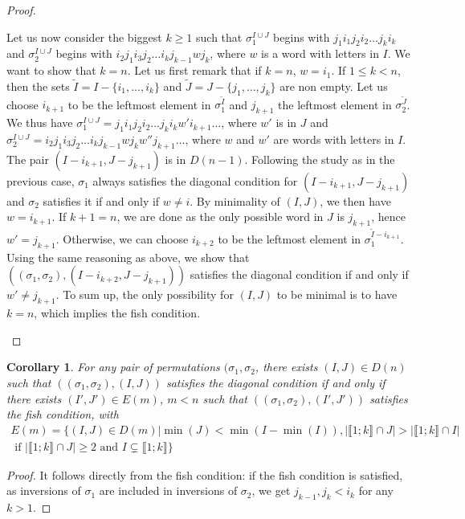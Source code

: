 \documentclass[11pt]{amsart}
\newtheorem{corollary}[thm]{Corollary}
\theoremstyle{definition}
\theoremstyle{remark}
\numberwithin{equation}{section}
\newcommand{\0}{\color{blue}{\mathsf{0}}}
\begin{document}
\begin{proof}
\begin{itemize}
Let us now consider the biggest $k\geq 1$ such that $\sigma^{I \cup J}_1$ begins with $j_1 i_1 j_2 i_2 \ldots j_k i_k$ and $\sigma^{I \cup J}_2$ begins with $i_2 j_1 i_3 j_2\ldots i_k j_{k-1} w j_k$, where $w$ is a word with letters in $I$. We want to show that $k=n$. Let us first remark that if $k=n$, $w=i_1$. If $1\leq k<n$, then the sets $\tilde{I}=I-\{i_1, \ldots, i_k\}$ and $\tilde{J}=J-\{j_1, \ldots, j_k\}$ are non empty. Let us choose $i_{k+1}$ to be the leftmost element in $\sigma^{\tilde{I}}_1$ and $j_{k+1}$ the leftmost element in $\sigma^{\tilde{J}}_2$. We thus have $\sigma^{I \cup J}_1=j_1 i_1 j_2 i_2 \ldots j_k i_k w' i_{k+1}\ldots$, where $w'$ is in $J$ and $\sigma^{I \cup J}_2= i_2 j_1 i_3 j_2\ldots i_k j_{k-1} w j_k w'' j_{k+1}\ldots $, where $w$ and $w'$ are words with letters in $I$. The pair $(I-i_{k+1},J-j_{k+1})$ is in $D(n-1)$. Following the study as in the previous case, $\sigma_1$ always satisfies the diagonal condition for $(I-i_{k+1},J-j_{k+1})$ and $\sigma_2$ satisfies it if and only if $w \neq i$. By minimality of $(I,J)$, we then have $w=i_{k+1}$. If $k+1=n$, we are done as the only possible word in $J$ is $j_{k+1}$, hence $w'=j_{k+1}$. Otherwise, we can choose $i_{k+2}$ to be the leftmost element in $\sigma_1^{\tilde{I}-i_{k+1}}$. Using the same reasoning as above, we show that $((\sigma_1, \sigma_2),(I-i_{k+2},J-j_{k+1}))$ satisfies the diagonal condition if and only if $w'\neq j_{k+1}$. To sum up, the only possibility for $(I,J)$ to be minimal is to have $k=n$, which implies the fish condition.
\end{itemize}
\end{proof}

\begin{corollary} For any pair of permutations $(\sigma_1, \sigma_2$, there exists $(I,J) \in D(n)$ such that $((\sigma_1, \sigma_2),(I,J))$ satisfies the diagonal condition if and only if there exists $(I',J') \in E(m)$, $m<n$ such that $((\sigma_1, \sigma_2),(I',J'))$ satisfies the fish condition, with 
\begin{multline}
E(m)=\{(I,J)\in D(m)| \min(J)<\min(I-\min(I)), |\llbracket 1; k \rrbracket \cap J| > |\llbracket 1; k \rrbracket \cap I| \\ \text{ if } |\llbracket 1; k \rrbracket \cap J| \geq 2 \text{ and } I \subsetneq \llbracket 1; k \rrbracket \}
\end{multline}
\end{corollary}

\begin{proof}
It follows directly from the fish condition: if the fish condition is satisfied, as inversions of $\sigma_1$ are included in inversions of $\sigma_2$, we get $j_{k-1},j_k<i_k$ for any $k>1$.
\end{proof}
\end{document}
